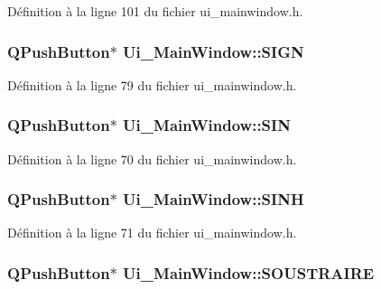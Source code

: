 \-Définition à la ligne 101 du fichier ui\-\_\-mainwindow.\-h.

\hypertarget{class_ui___main_window_a5a851ab1cd3ae5dac5d8cf6b6e22e956}{
\subsubsection[{\-S\-I\-G\-N}]{\setlength{\rightskip}{0pt plus 5cm}\-Q\-Push\-Button$\ast$ {\bf \-Ui\-\_\-\-Main\-Window\-::\-S\-I\-G\-N}}}\label{class_ui___main_window_a5a851ab1cd3ae5dac5d8cf6b6e22e956}


\-Définition à la ligne 79 du fichier ui\-\_\-mainwindow.\-h.

\hypertarget{class_ui___main_window_ac1caf33332e6d63e4ec1a9071713493b}{
\subsubsection[{\-S\-I\-N}]{\setlength{\rightskip}{0pt plus 5cm}\-Q\-Push\-Button$\ast$ {\bf \-Ui\-\_\-\-Main\-Window\-::\-S\-I\-N}}}\label{class_ui___main_window_ac1caf33332e6d63e4ec1a9071713493b}


\-Définition à la ligne 70 du fichier ui\-\_\-mainwindow.\-h.

\hypertarget{class_ui___main_window_a22cb4dc418e7679c26754c84c1529a29}{
\subsubsection[{\-S\-I\-N\-H}]{\setlength{\rightskip}{0pt plus 5cm}\-Q\-Push\-Button$\ast$ {\bf \-Ui\-\_\-\-Main\-Window\-::\-S\-I\-N\-H}}}\label{class_ui___main_window_a22cb4dc418e7679c26754c84c1529a29}


\-Définition à la ligne 71 du fichier ui\-\_\-mainwindow.\-h.

\hypertarget{class_ui___main_window_ac0e681bd2bc1ee327deede20741b33c7}{
\subsubsection[{\-S\-O\-U\-S\-T\-R\-A\-I\-R\-E}]{\setlength{\rightskip}{0pt plus 5cm}\-Q\-Push\-Button$\ast$ {\bf \-Ui\-\_\-\-Main\-Window\-::\-S\-O\-U\-S\-T\-R\-A\-I\-R\-E}}}\label{class_ui___main_window_ac0e681bd2bc1ee327deede20741b33c7}


